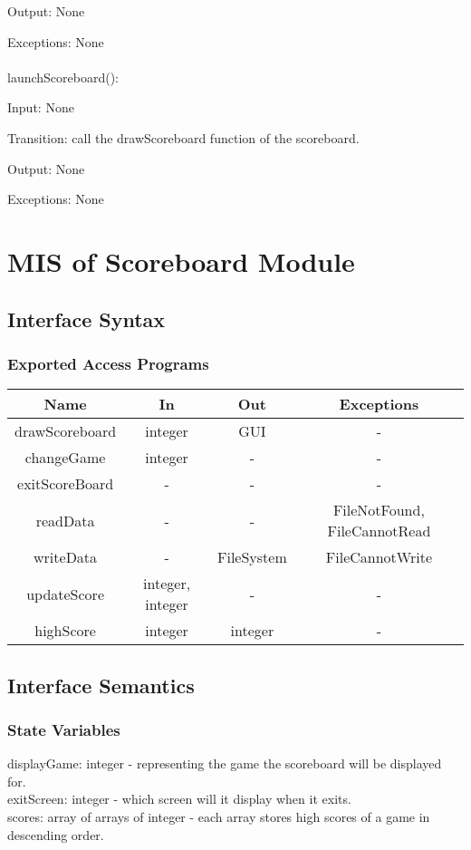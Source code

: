 \documentclass[12pt, titlepage]{article}
\begin{document}
		Output: None
		
		Exceptions: None\\
		\\
		launchScoreboard():
		
		Input: None
		
		Transition: call the drawScoreboard function of the scoreboard.
		
		Output: None
		
		Exceptions: None
	
	

\section{MIS of Scoreboard Module}
		\subsection{Interface Syntax}
		\subsubsection{Exported Access Programs}
		\begin{tabular}[pos]{|c|c|c|c|}
			\hline
			\textbf{Name}& \textbf{In} & \textbf{Out} & \textbf{Exceptions} \\ \hline
			drawScoreboard & integer & GUI & - \\ \hline
			changeGame & integer & - & - \\ \hline
			exitScoreBoard & - & - & - \\ \hline
			readData & - & - & FileNotFound, FileCannotRead \\ \hline
			writeData & - & FileSystem & FileCannotWrite \\ \hline
			updateScore & integer, integer & - & - \\ \hline
			highScore & integer & integer & - \\ \hline
		\end{tabular}
		\subsection{Interface Semantics}
		\subsubsection{State Variables}
		displayGame: integer - representing the game the scoreboard will be displayed for.\\
		exitScreen: integer - which screen will it display when it exits.\\
		scores: array of arrays of integer - each array stores high scores of a game in descending order.
\end{document}
